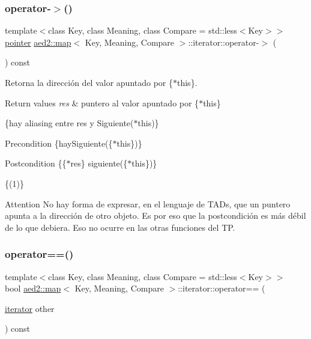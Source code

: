 \subsubsection{\texorpdfstring{operator-\/$>$()}{operator->()}}
{\footnotesize\ttfamily template$<$class Key, class Meaning, class Compare = std\+::less$<$\+Key$>$$>$ \\
\hyperlink{classaed2_1_1map_1_1iterator_a52ea7bdbf1dc6b252aec76633564bdf5}{pointer} \hyperlink{classaed2_1_1map}{aed2\+::map}$<$ Key, Meaning, Compare $>$\+::iterator\+::operator-\/$>$ (\begin{DoxyParamCaption}{ }\end{DoxyParamCaption}) const\hspace{0.3cm}{\ttfamily [inline]}}



Retorna la dirección del valor apuntado por \{$\ast$this\}. 


\begin{DoxyRetVals}{Return values}
{\em res} & puntero al valor apuntado por \{$\ast$this\}\\
\hline
\end{DoxyRetVals}
\{hay aliasing entre res y Siguiente($\ast$this)\}

\begin{DoxyPrecond}{Precondition}
\{hay\+Siguiente(\{$\ast$this\})\} 
\end{DoxyPrecond}
\begin{DoxyPostcond}{Postcondition}
\{\{$\ast$res\}  siguiente(\{$\ast$this\})\}
\end{DoxyPostcond}
\{(1)\}

\begin{DoxyAttention}{Attention}
No hay forma de expresar, en el lenguaje de T\+A\+Ds, que un puntero apunta a la dirección de otro objeto. Es por eso que la postcondición es más débil de lo que debiera. Eso no ocurre en las otras funciones del TP. 
\end{DoxyAttention}
\mbox{\label{classaed2_1_1map_1_1iterator_a34f6622845af93ca42f1be8516eeafa2}} 
\subsubsection{\texorpdfstring{operator==()}{operator==()}}
{\footnotesize\ttfamily template$<$class Key, class Meaning, class Compare = std\+::less$<$\+Key$>$$>$ \\
bool \hyperlink{classaed2_1_1map}{aed2\+::map}$<$ Key, Meaning, Compare $>$\+::iterator\+::operator== (\begin{DoxyParamCaption}\item[{\hyperlink{classaed2_1_1map_1_1iterator}{iterator}}]{other }\end{DoxyParamCaption}) const\hspace{0.3cm}{\ttfamily [inline]}}



